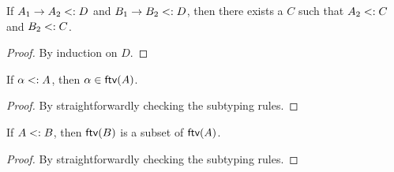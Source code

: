 \begin{lemma}
  \label{lemma:common-supertype}

  If $A_1 \to A_2 <: D$ and $B_1 \to B_2 <: D$,
  then there exists a $C$ such that $A_2 <: C$ and $B_2 <: C$.
\end{lemma}

\begin{proof}
  By induction on $D$.
\end{proof}

\begin{lemma}
  \label{lemma:subtype-ftv-var}

  If $\alpha <: A$, then $\alpha \in \textsf{ftv}(A)$.
\end{lemma}

\begin{proof}
  By straightforwardly checking the subtyping rules.
\end{proof}

\begin{lemma}
  \label{lemma:subtype-ftv}

  If $A <: B$, then $\textsf{ftv}(B)$ is a subset of $\textsf{ftv}(A)$.
\end{lemma}

\begin{proof}
  By straightforwardly checking the subtyping rules.
\end{proof}

\algodissoundness*

